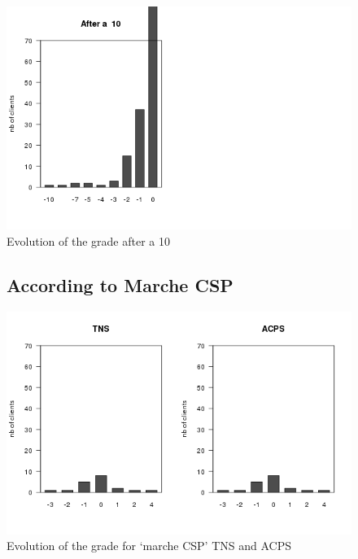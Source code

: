 \documentclass[a4paper, 11pt]{article}
\begin{document}
    \begin{figure}[!ht]
            \centering
            \includegraphics[height = 10 cm]{Remi/Evolution_of_the_grade_after_a_10.png}
            \caption{Evolution of the grade after a 10}
            \label{fig:e_10}
    \end{figure}

    \begin{figure}[!ht]
			\subsection{According to Marche CSP}
            \centering
            \includegraphics[height = 10 cm]{Remi/Evolution_of_the_grade_for_marche_CSP_ACPS.png}
            \caption{Evolution of the grade for `marche CSP' TNS and ACPS}
            \label{fig:e_CSP_ACPS}
    \end{figure}
\end{document}
